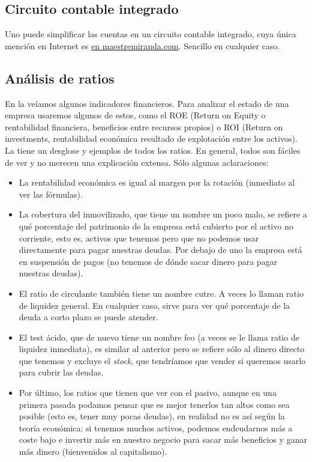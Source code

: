 \documentclass[nochap,palatino,shortheader]{apuntes}
\begin{document}
\subsection{Circuito contable integrado}

Uno puede simplificar las cuentas en un circuito contable integrado, cuya única mención en Internet es \href{http://maestremiranda.com/techdir/wp-content/uploads/2015/10/CircuitoContable.pdf}{en maestremiranda.com}. Sencillo en cualquier caso.

\subsection{Análisis de ratios}

En la  veíamos algunos indicadores financieros. Para analizar el estado de una empresa usaremos algunos de estos, como el ROE (Return on Equity o rentabilidad financiera, beneficios entre recursos propios) o ROI (Return on investments, rentabilidad económica resultado de explotación entre los activos). La  tiene un desglose y ejemplos de todos los ratios. En general, todos son fáciles de ver y no merecen una explicación extensa. Sólo algunas aclaraciones:

\begin{itemize}
\item La rentabilidad económica es igual al margen por la rotación (inmediato al ver las fórmulas).
\item La cobertura del inmovilizado, que tiene un nombre un poco malo, se refiere a qué porcentaje del patrimonio de la empresa está cubierto por el activo no corriente, esto es, activos que tenemos pero que no podemos usar directamente para pagar nuestras deudas. Por debajo de uno la empresa está en suspensión de pagos (no tenemos de dónde sacar dinero para pagar nuestras deudas).
\item El ratio de circulante también tiene un nombre cutre. A veces lo llaman ratio de liquidez general. En cualquier caso, sirve para ver qué porcentaje de la deuda a corto plazo se puede atender.
\item El test ácido, que de nuevo tiene un nombre feo (a veces se le llama ratio de liquidez inmediata), es similar al anterior pero se refiere sólo al dinero directo que tenemos y excluye el \textit{stock}, que tendríamos que vender si queremos usarlo para cubrir las deudas.
\item Por último, los ratios que tienen que ver con el pasivo, aunque en una primera pasada podamos pensar que es mejor tenerlos tan altos como sea posible (esto es, tener muy pocas deudas), en realidad no es así según la teoría económica: si tenemos muchos activos, podemos endeudarnos más a coste bajo e invertir más en nuestro negocio para sacar más beneficios y ganar más dinero (bienvenidos al capitalismo).
\end{itemize}
\end{document}
